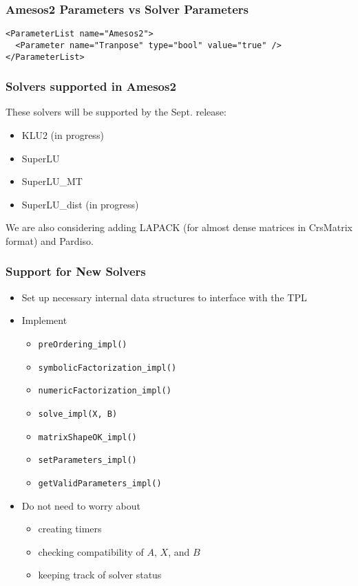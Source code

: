 \documentclass[xcolor=dvipsnames]{beamer}
\begin{document}
\begin{frame}[fragile]
  \frametitle{Amesos2 Parameters vs Solver Parameters}
\small
\texttt{<ParameterList name="Amesos2">}\\
\texttt{~~<Parameter name="Tranpose" type="bool" value="true" />}\\
\texttt{</ParameterList>}
\end{frame}

\begin{frame}
  \frametitle{Solvers supported in Amesos2}
  These solvers will be supported by the Sept. release:
  \begin{itemize}
  \item KLU2 (in progress)
  \item SuperLU
  \item SuperLU\_MT
  \item SuperLU\_dist (in progress)
  \end{itemize}
We are also considering adding LAPACK (for almost dense matrices in CrsMatrix 
format) and Pardiso.
\end{frame}

\begin{frame}
  \frametitle{Support for New Solvers}
  \begin{itemize}
    \item Set up necessary internal data structures to interface with
      the TPL
    \item Implement
      \begin{itemize}
        \item \texttt{preOrdering\_impl()}
        \item \texttt{symbolicFactorization\_impl()}
        \item \texttt{numericFactorization\_impl()}
        \item \texttt{solve\_impl(X, B)}
        \item \texttt{matrixShapeOK\_impl()}
        \item \texttt{setParameters\_impl()}
        \item \texttt{getValidParameters\_impl()}
      \end{itemize}
    \item Do not need to worry about
      \begin{itemize}
        \item creating timers
        \item checking compatibility of $A$, $X$, and $B$
        \item keeping track of solver status
      \end{itemize}
  \end{itemize}
\end{frame}
\end{document}
